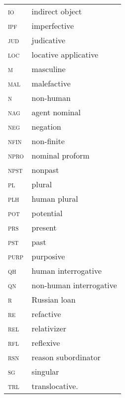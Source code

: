 \documentclass[output=paper]{langscibook}
\begin{document}
\begin{tabularx}{.45\textwidth}{lQ}
\textsc{io} & indirect object\\
\textsc{ipf} & imperfective\\
\textsc{jud} & judicative\\
\textsc{loc} & locative applicative\\
\textsc{m} & masculine\\
\textsc{mal} & malefactive\\
\textsc{n} & non-human\\
\textsc{nag} & agent nominal\\
\textsc{neg} & negation\\
\textsc{nfin} & non-finite\\
\textsc{npro} & nominal proform\\
\textsc{npst} & nonpast\\
\textsc{pl} & plural\\
\textsc{plh} & human plural\\
\textsc{pot} & potential\\
\textsc{prs} & present\\
\textsc{pst} & past\\
\textsc{purp} & purposive\\
\textsc{qh} & human interrogative\\
\textsc{qn} & non-human interrogative\\
\textsc{r} & Russian loan\\
\textsc{re} & refactive\\
\textsc{rel} & relativizer\\
\textsc{rfl} & reflexive\\
\textsc{rsn} & reason subordinator\\
\textsc{sg} &  singular\\
\textsc{trl} & translocative.
\end{tabularx}


{\sloppy\printbibliography[heading=subbibliography,notkeyword=this]}
\end{document}
